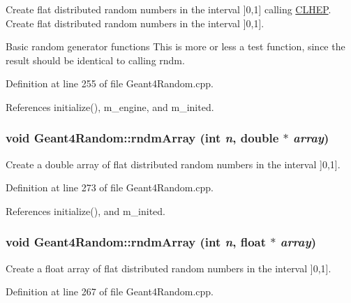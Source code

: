 Create flat distributed random numbers in the interval \mbox{]}0,1\mbox{]} calling \hyperlink{namespace_c_l_h_e_p}{CLHEP}. Create flat distributed random numbers in the interval \mbox{]}0,1\mbox{]}.

Basic random generator functions This is more or less a test function, since the result should be identical to calling rndm. 

Definition at line 255 of file Geant4Random.cpp.

References initialize(), m\_\-engine, and m\_\-inited.\hypertarget{class_d_d4hep_1_1_simulation_1_1_geant4_random_a45700086c1a78f0982bd5539e9263895}{
\subsubsection[{rndmArray}]{\setlength{\rightskip}{0pt plus 5cm}void Geant4Random::rndmArray (int {\em n}, \/  double $\ast$ {\em array})}}
\label{class_d_d4hep_1_1_simulation_1_1_geant4_random_a45700086c1a78f0982bd5539e9263895}


Create a double array of flat distributed random numbers in the interval \mbox{]}0,1\mbox{]}. 

Definition at line 273 of file Geant4Random.cpp.

References initialize(), and m\_\-inited.\hypertarget{class_d_d4hep_1_1_simulation_1_1_geant4_random_aaf9f4a7acf4d65ce0b3f6b19486d473d}{
\subsubsection[{rndmArray}]{\setlength{\rightskip}{0pt plus 5cm}void Geant4Random::rndmArray (int {\em n}, \/  float $\ast$ {\em array})}}
\label{class_d_d4hep_1_1_simulation_1_1_geant4_random_aaf9f4a7acf4d65ce0b3f6b19486d473d}


Create a float array of flat distributed random numbers in the interval \mbox{]}0,1\mbox{]}. 

Definition at line 267 of file Geant4Random.cpp.

